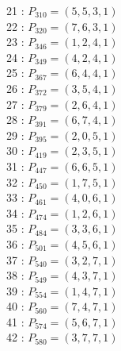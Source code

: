 \documentclass{article}
\begin{document}
{\begin{multicols}{2}
21 : $P_{310}=( 5, 5, 3, 1 )$\\
22 : $P_{320}=( 7, 6, 3, 1 )$\\
23 : $P_{346}=( 1, 2, 4, 1 )$\\
24 : $P_{349}=( 4, 2, 4, 1 )$\\
25 : $P_{367}=( 6, 4, 4, 1 )$\\
26 : $P_{372}=( 3, 5, 4, 1 )$\\
27 : $P_{379}=( 2, 6, 4, 1 )$\\
28 : $P_{391}=( 6, 7, 4, 1 )$\\
29 : $P_{395}=( 2, 0, 5, 1 )$\\
30 : $P_{419}=( 2, 3, 5, 1 )$\\
31 : $P_{447}=( 6, 6, 5, 1 )$\\
32 : $P_{450}=( 1, 7, 5, 1 )$\\
33 : $P_{461}=( 4, 0, 6, 1 )$\\
34 : $P_{474}=( 1, 2, 6, 1 )$\\
35 : $P_{484}=( 3, 3, 6, 1 )$\\
36 : $P_{501}=( 4, 5, 6, 1 )$\\
37 : $P_{540}=( 3, 2, 7, 1 )$\\
38 : $P_{549}=( 4, 3, 7, 1 )$\\
39 : $P_{554}=( 1, 4, 7, 1 )$\\
40 : $P_{560}=( 7, 4, 7, 1 )$\\
41 : $P_{574}=( 5, 6, 7, 1 )$\\
42 : $P_{580}=( 3, 7, 7, 1 )$\\
\end{multicols}
}
\end{document}
